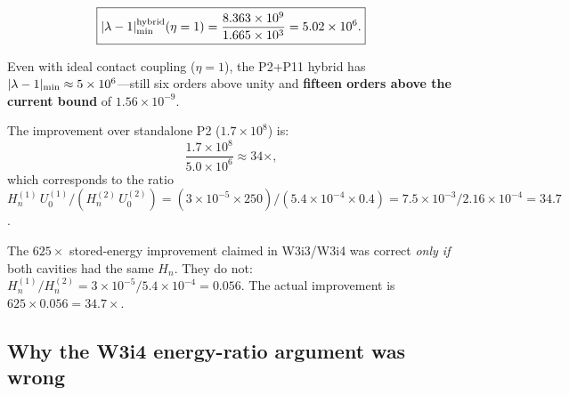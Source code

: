 \documentclass[11pt,twocolumn]{article}
\newcommand{\lam}{\lambda}
\newcommand{\ee}[1]{\times 10^{#1}}
\newcommand{\Heff}{H_n}
\theoremstyle{definition}
\theoremstyle{remark}
\begin{document}
\begin{equation}
\boxed{
|\lam-1|_{\rm min}^{\rm hybrid}(\eta=1)
= \frac{8.363\ee{9}}{1.665\ee{3}}
= 5.02\ee{6}.
}
\label{eq:hybrid_result}
\end{equation}

\begin{tcolorbox}[colback=red!10!white, colframe=red!70!black,
  title=\textbf{CRITICAL RESULT: P2+P11 Hybrid Also Cannot Detect Psi}]
Even with ideal contact coupling ($\eta = 1$), the P2+P11 hybrid has
$|\lam-1|_{\rm min} \approx 5\ee{6}$---still six orders above unity and
\textbf{fifteen orders above the current bound} of $1.56\ee{-9}$.

The improvement over standalone P2 ($1.7\ee{8}$) is:
\begin{equation}
\frac{1.7\ee{8}}{5.0\ee{6}} \approx 34\times,
\label{eq:hybrid_improvement}
\end{equation}
which corresponds to the ratio $\Heff^{(1)}\,U_0^{(1)}/(\Heff^{(2)}\,U_0^{(2)})
= (3\ee{-5}\times 250)/(5.4\ee{-4}\times 0.4) = 7.5\ee{-3}/2.16\ee{-4} = 34.7$.

The $625\times$ stored-energy improvement claimed in W3i3/W3i4 was correct
\emph{only if} both cavities had the same $\Heff$. They do not:
$\Heff^{(1)}/\Heff^{(2)} = 3\ee{-5}/5.4\ee{-4} = 0.056$.
The actual improvement is $625\times 0.056 = 34.7\times$.
\end{tcolorbox}

\subsection{Why the W3i4 energy-ratio argument was wrong}
\label{sec:why_wrong}
\end{document}
